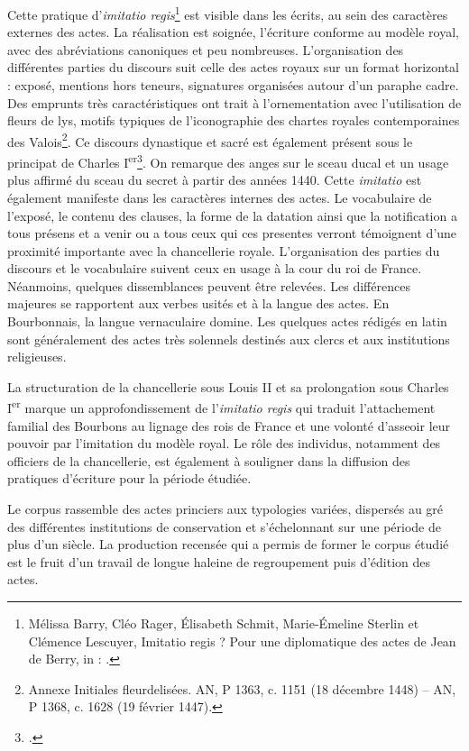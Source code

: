 \par Cette pratique d'\textit{imitatio regis}\footnote{Mélissa Barry, Cléo Rager, Élisabeth Schmit, Marie-Émeline Sterlin et Clémence Lescuyer, \og \og Imitatio regis \fg ? Pour une diplomatique des actes de Jean de Berry\fg, in : \cite{guyotjeanninJeanBerryEcrit2019}.} est visible dans les écrits, au sein des caractères externes des actes. La réalisation est soignée, l'écriture conforme au modèle royal, avec des abréviations canoniques et peu nombreuses. L'organisation des différentes parties du discours suit celle des actes royaux sur un format horizontal : exposé, mentions hors teneurs, signatures organisées autour d'un paraphe cadre. Des emprunts très caractéristiques ont trait à l'ornementation avec l'utilisation de fleurs de lys, motifs typiques de l’iconographie des chartes royales contemporaines des Valois\footnote{Annexe Initiales fleurdelisées. \newline AN, P 1363, c. 1151 (18 décembre 1448) – AN, P 1368, c. 1628 (19 février 1447).}. Ce discours dynastique et sacré est également présent sous le principat de Charles I\textsuperscript{er}\footnote{\cite{generoSceauxArmesCharles2022}.}. On remarque des anges sur le sceau ducal et un usage plus affirmé du sceau du secret à partir des années 1440. Cette \textit{imitatio} est également manifeste dans les caractères internes des actes. Le vocabulaire de l'exposé, le contenu des clauses, la forme de la datation ainsi que la notification \og a tous présens et a venir \fg \space ou \og a tous ceux qui ces presentes verront \fg \space témoignent d'une proximité importante avec la chancellerie royale. L'organisation des parties du discours et le vocabulaire suivent ceux en usage à la cour du roi de France. Néanmoins, quelques dissemblances peuvent être relevées. Les différences majeures se rapportent aux verbes usités et à la langue des actes. En Bourbonnais, la langue vernaculaire domine. Les quelques actes rédigés en latin sont généralement des actes très solennels destinés aux clercs et aux institutions religieuses. 
\newline
\par La structuration de la chancellerie sous Louis II et sa prolongation sous Charles I\textsuperscript{er} marque un approfondissement de l'\textit{imitatio regis} qui traduit l'attachement familial des Bourbons au lignage des rois de France et une volonté d'asseoir leur pouvoir par l'imitation du modèle royal. Le rôle des individus, notamment des officiers de la chancellerie, est également à souligner dans la diffusion des pratiques d’écriture pour la période étudiée. 
\newline 
\newline 
\par Le corpus rassemble des actes princiers aux typologies variées, dispersés au gré des différentes institutions de conservation et s'échelonnant sur une période de plus d'un siècle. La production recensée qui a permis de former le corpus étudié est le fruit d'un travail de longue haleine de regroupement puis d'édition des actes. 

